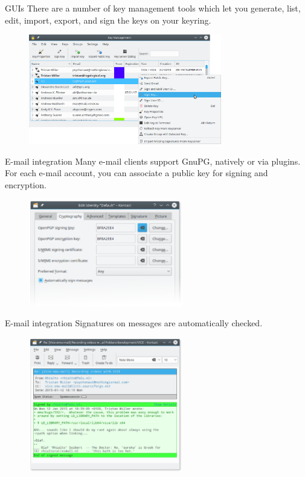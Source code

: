 \documentclass[
mode=present,
paper=smartboard,
size=20pt,
]{powerdot}
\begin{document}
\begin{slide}{GUIs}
  There are a number of key management tools which let you generate,
  list, edit, import, export, and sign the keys on your keyring.
  \begin{figure}[H]
    \centering
    \includegraphics[width=0.75\textwidth]{images/kgpg1.eps}
    \label{fig:kgpg1}
  \end{figure}
\end{slide}

\begin{slide}{E-mail integration}
  Many e-mail clients support GnuPG, natively or via plugins.  For
  each e-mail account, you can associate a public key for signing and
  encryption.
  \begin{figure}[H]
    \centering
    \includegraphics[width=0.6\textwidth]{images/kmail_conf.eps}
    \label{fig:kmail_conf}
  \end{figure}
\end{slide}

\begin{slide}[toc=]{E-mail integration}
  Signatures on messages are automatically checked.
  \begin{figure}[H]
    \centering
    \includegraphics[width=0.6\textwidth]{images/kmail_recvd.eps}
    \label{fig:kmail_recvd}
  \end{figure}
\end{slide}
\end{document}
